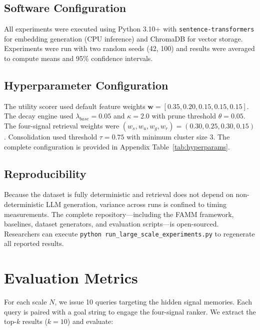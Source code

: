 \documentclass[conference]{IEEEtran}
\begin{document}
\subsection{Software Configuration}
All experiments were executed using Python 3.10+ with \texttt{sentence-transformers} for embedding generation (CPU inference) and ChromaDB for vector storage. Experiments were run with two random seeds (42, 100) and results were averaged to compute means and 95\% confidence intervals.

\subsection{Hyperparameter Configuration}
The utility scorer used default feature weights $\mathbf{w} = [0.35, 0.20, 0.15, 0.15, 0.15]$. The decay engine used $\lambda_{base}{=}0.05$ and $\kappa{=}2.0$ with prune threshold $\theta{=}0.05$. The four-signal retrieval weights were $(w_s, w_u, w_g, w_r) = (0.30, 0.25, 0.30, 0.15)$. Consolidation used threshold $\tau{=}0.75$ with minimum cluster size 3. The complete configuration is provided in Appendix Table~\ref{tab:hyperparams}.

\subsection{Reproducibility}
Because the dataset is fully deterministic and retrieval does not depend on non-deterministic LLM generation, variance across runs is confined to timing measurements. The complete repository---including the FAMM framework, baselines, dataset generators, and evaluation scripts---is open-sourced. Researchers can execute \texttt{python run\_large\_scale\_experiments.py} to regenerate all reported results.

\section{Evaluation Metrics}
\label{sec:metrics}

For each scale $N$, we issue 10 queries targeting the hidden signal memories. Each query is paired with a goal string to engage the four-signal ranker. We extract the top-$k$ results ($k{=}10$) and evaluate:
\end{document}
